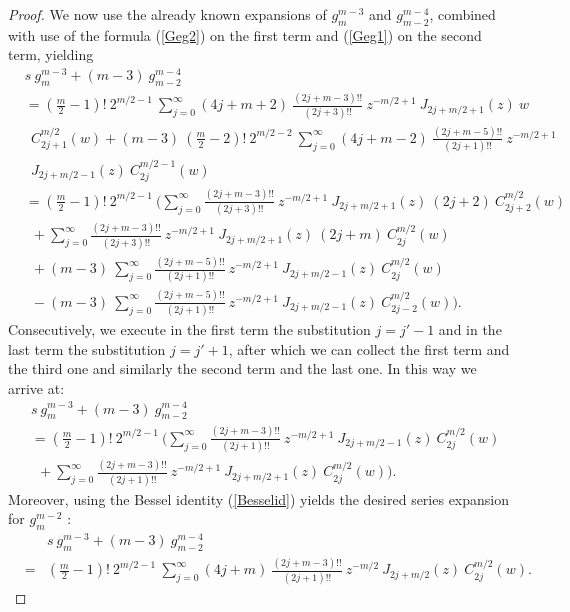 \documentclass{amsart}
\theoremstyle{remark}
\begin{document}
\begin{proof}
We now use the already known expansions of $g_m^{m-3}$ and $g_{m-2}^{m-4}$, combined with use of the formula (\ref{Geg2}) on the first term and (\ref{Geg1}) on the second term, yielding
\begin{align*}
&  s \ g_m^{m-3} + (m-3) \ g_{m-2}^{m-4} \\
&=   \left( \frac{m}{2}-1 \right)! \ 2^{m/2-1} \ \sum_{j=0}^{\infty} (4j+m+2) \ \frac{(2j+m-3)!!}{(2j+3)!!} \ z^{-m/2+1} \ J_{2j+m/2+1}(z) \ w\\
& \ \    C_{2j+1}^{m/2}(w) + (m-3) \ \left( \frac{m}{2}-2 \right)! \ 2^{m/2-2} \ \sum_{j=0}^{\infty} (4j+m-2) \ \frac{(2j+m-5)!!}{(2j+1)!!} \ z^{-m/2+1} \\
& \ \  J_{2j+m/2-1}(z) \  C_{2j}^{m/2-1}(w)\\
&=  \left( \frac{m}{2}-1 \right)! \ 2^{m/2-1} \  \biggl( \sum_{j=0}^{\infty} \frac{(2j+m-3)!!}{(2j+3)!!} \ z^{-m/2+1} \ J_{2j+m/2+1}(z) \ (2j+2) \  C_{2j+2}^{m/2}(w)\\
& \ \  + \sum_{j=0}^{\infty} \frac{(2j+m-3)!!}{(2j+3)!!} \ z^{-m/2+1} \ J_{2j+m/2+1}(z) \ (2j+m) \  C_{2j}^{m/2}(w)\\
& \ \  + (m-3) \ \sum_{j=0}^{\infty} \frac{(2j+m-5)!!}{(2j+1)!!} \ z^{-m/2+1} \ J_{2j+m/2-1}(z)  \  C_{2j}^{m/2}(w)\\
& \ \ - (m-3) \ \sum_{j=0}^{\infty} \frac{(2j+m-5)!!}{(2j+1)!!} \ z^{-m/2+1} \ J_{2j+m/2-1}(z)  \  C_{2j-2}^{m/2}(w) \biggr) .
\end{align*}
Consecutively, we execute in the first term the substitution $j=j'-1$ and in the last term the substitution $j=j'+1$, after which we can collect the first term and the third one and similarly the second term and the last one. In this way we arrive at:
\begin{align*}
&  s \ g_m^{m-3} + (m-3) \ g_{m-2}^{m-4} \\
&=   \left( \frac{m}{2}-1 \right)! \ 2^{m/2-1} \ \biggl( \sum_{j=0}^{\infty} \frac{(2j+m-3)!!}{(2j+1)!!} \ z^{-m/2+1} \ J_{2j+m/2-1}(z) \  C_{2j}^{m/2}(w)\\
& \ \ + \sum_{j=0}^{\infty} \frac{(2j+m-3)!!}{(2j+1)!!} \ z^{-m/2+1} \ J_{2j+m/2+1}(z) \  C_{2j}^{m/2}(w) \biggr) .
\end{align*}
Moreover, using the Bessel identity (\ref{Besselid}) yields the desired series expansion for $g_m^{m-2}$ :
\begin{eqnarray*}
& & s \ g_m^{m-3} + (m-3) \ g_{m-2}^{m-4} \\
& = &  \left( \frac{m}{2}-1 \right)! \ 2^{m/2-1} \ \sum_{j=0}^{\infty} (4j+m) \ \frac{(2j+m-3)!!}{(2j+1)!!} \ z^{-m/2} \ J_{2j+m/2}(z) \  C_{2j}^{m/2}(w)  .
\end{eqnarray*}


\end{proof}
\end{document}
